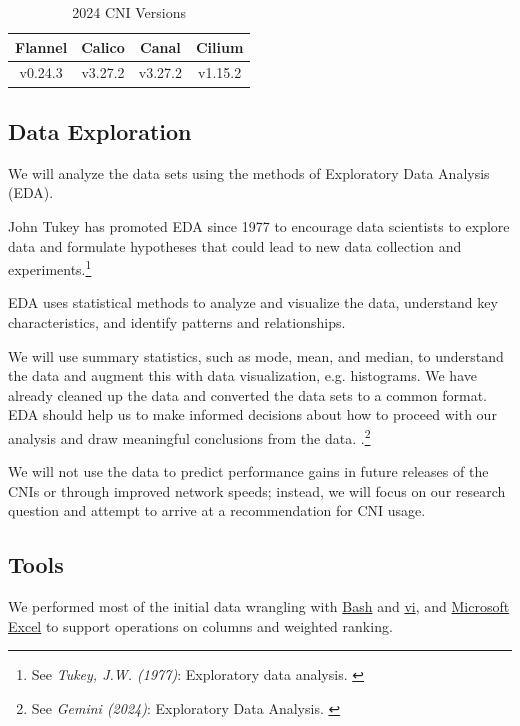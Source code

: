 \begin{table}[H]
\caption{2024 CNI Versions}
\begin{tabular}{|c | c | c | c |} 
 \hline
 Flannel & Calico & Canal & Cilium \\
 \hline
 v0.24.3 & v3.27.2 & v3.27.2 & v1.15.2 \\ 
 \hline
\end{tabular}
\label{tab:2024ver}
\end{table}

\subsection{Data Exploration}

We will analyze the data sets using the methods of Exploratory Data Analysis (EDA).

John Tukey has promoted EDA since 1977 to encourage data scientists to explore data and formulate hypotheses that could lead to new data collection and experiments.\footnote{See \textit{Tukey, J.W. (1977)}: Exploratory data analysis. \cite{exploratoryDA}}

EDA uses statistical methods to analyze and visualize the data, understand key characteristics, and identify patterns and relationships. 

We will use summary statistics, such as mode, mean, and median, to understand the data and augment this with data visualization, e.g. histograms. We have already cleaned up the data and converted the data sets to a common format. EDA should help us to make informed decisions about how to proceed with our analysis and draw meaningful conclusions from the data. .\footnote{See \textit{Gemini (2024)}: Exploratory Data Analysis. \cite{bardExploratory}}  

We will not use the data to predict performance gains in future releases of the CNIs or through improved network speeds; instead, we will focus on our research question and attempt to arrive at a recommendation for CNI usage.

\subsection{Tools}

We performed most of the initial data wrangling with \href{https://www.gnu.org/software/bash/}{Bash} and \href{https://pubs.opengroup.org/onlinepubs/9699919799/utilities/vi.html}{vi}, and \href{https://www.microsoft.com/en-us/microsoft-365/excel}{Microsoft Excel} to support operations on columns and weighted ranking.

